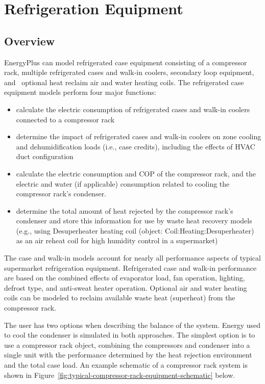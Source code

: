 \section{Refrigeration Equipment }\label{refrigeration-equipment}

\subsection{Overview}\label{overview-023}

EnergyPlus can model refrigerated case equipment consisting of a compressor rack, multiple refrigerated cases and walk-in coolers, secondary loop equipment, and~ optional heat reclaim air and water heating coils. The refrigerated case equipment models perform four major functions:

\begin{itemize}
  \item calculate the electric consumption of refrigerated cases and walk-in coolers connected to a compressor rack
  \item determine the impact of refrigerated cases and walk-in coolers on zone cooling and dehumidification loads (i.e., case credits), including the effects of HVAC duct configuration
  \item calculate the electric consumption and COP of the compressor rack, and the electric and water (if applicable) consumption related to cooling the compressor rack's condenser.
  \item determine the total amount of heat rejected by the compressor rack's condenser and store this information for use by waste heat recovery models (e.g., using Desuperheater heating coil (object: Coil:Heating:Desuperheater) as an air reheat coil for high humidity control in a supermarket)
\end{itemize}

The case and walk-in models account for nearly all performance aspects of typical supermarket refrigeration equipment. Refrigerated case and walk-in performance are based on the combined effects of evaporator load, fan operation, lighting, defrost type, and anti-sweat heater operation. Optional air and water heating coils can be modeled to reclaim available waste heat (superheat) from the compressor rack.

The user has two options when describing the balance of the system. Energy used to cool the condenser is simulated in both approaches. The simplest option is to use a compressor rack object, combining the compressors and condenser into a single unit with the performance determined by the heat rejection environment and the total case load. An example schematic of a compressor rack system is shown in Figure~\ref{fig:typical-compressor-rack-equipment-schematic} below.

